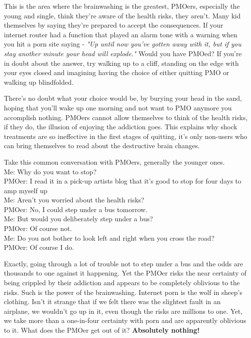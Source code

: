 \documentclass[easypeasy.tex]{subfiles}
\begin{document}
This is the area where the brainwashing is the greatest, PMOers, especially the young and single, think they're aware of the health risks, they aren't. Many kid themselves by saying they're prepared to accept the consequences. If your internet router had a function that played an alarm tone with a warning when you hit a porn site saying - \textit{"Up until now you've gotten away with it, but if you stay another minute your head will explode."} Would you have PMOed? If you're in doubt about the answer, try walking up to a cliff, standing on the edge with your eyes closed and imagining having the choice of either quitting PMO or walking up blindfolded.

There's no doubt what your choice would be, by burying your head in the sand, hoping that you'll wake up one morning and not want to PMO anymore you accomplish nothing. PMOers cannot allow themselves to think of the health risks, if they do, the illusion of enjoying the addiction goes. This explains why shock treatments are so ineffective in the first stages of quitting, it's only non-users who can bring themselves to read about the destructive brain changes.

Take this common conversation with PMOers, generally the younger ones.\\
  Me: Why do you want to stop?\\
  PMOer: I read it in a pick-up artists blog that it's good to stop for four days to amp myself up\\
  Me: Aren't you worried about the health risks?\\
  PMOer: No, I could step under a bus tomorrow.\\
  Me: But would you deliberately step under a bus?\\
  PMOer: Of course not.\\
  Me: Do you not bother to look left and right when you cross the road?\\
  PMOer: Of course I do.

Exactly, going through a lot of trouble not to step under a bus and the odds are thousands to one against it happening. Yet the PMOer risks the near certainty of being crippled by their addiction and appears to be completely oblivious to the risks. Such is the power of the brainwashing. Internet porn is the wolf in sheep's clothing. Isn't it strange that if we felt there was the slightest fault in an airplane, we wouldn't go up in it, even though the risks are millions to one. Yet, we take more than a one-in-four certainty with porn and are apparently oblivious to it. What does the PMOer get out of it? \textbf{Absolutely nothing!}
\end{document}

